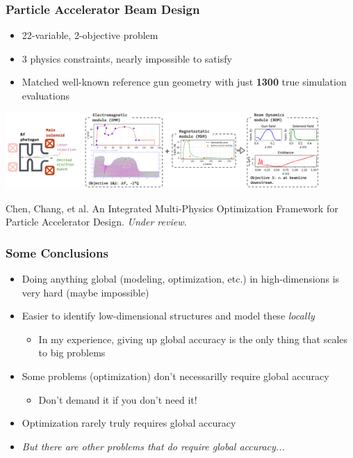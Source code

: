\documentclass[aspectratio=169]{beamer}
\begin{document}
\begin{frame}
\frametitle{Particle Accelerator Beam Design}

\begin{itemize}
\item 22-variable, 2-objective problem
\item 3 physics constraints, nearly impossible to satisfy
\item Matched well-known reference gun geometry with just
      {\bf 1300} true simulation evaluations
\end{itemize}

\begin{center}
\includegraphics[width=0.9\textwidth]{../img/moo_new/accelerator_design.png}
\end{center}

\vfill

{\tiny

Chen, Chang, et al.
An Integrated Multi-Physics Optimization Framework for Particle Accelerator Design.
{\sl Under review.}

}

\end{frame}

\begin{frame}
\frametitle{Some Conclusions}

\begin{itemize}
\item Doing anything global (modeling, optimization, etc.) in high-dimensions
is very hard (maybe impossible)
\item Easier to identify low-dimensional structures and model these {\sl locally}
\begin{itemize}
\item In my experience, giving up global accuracy is the only thing that scales to big problems
\end{itemize}
\item Some problems (optimization) don't necessarilly require global accuracy
\begin{itemize}
\item Don't demand it if you don't need it!
\end{itemize}
\item Optimization rarely truly requires global accuracy
\pause\item {\sl But there are other problems that do require global accuracy...}
\end{itemize}

\end{frame}
\end{document}
